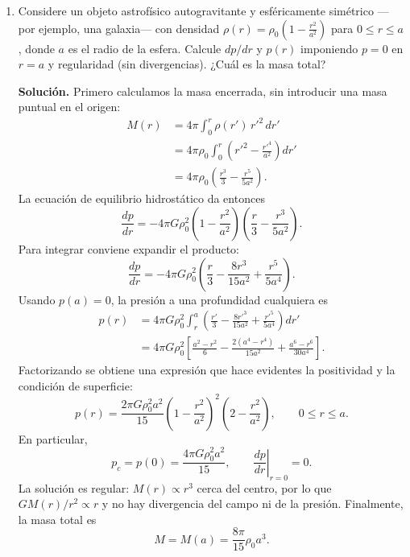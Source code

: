 \begin{enumerate}
\textit{3. Dependencia con el radio a masa fija.} Sustituyendo la densidad deducida en la expresión de la presión central,
$$
\begin{aligned}
p_c
&=\frac{2\pi G}{3}\rho_0^2a^2\\
&=\frac{2\pi G}{3}\left(\frac{3M_0}{4\pi a^3}\right)^2a^2
=\boxed{\frac{3GM_0^2}{8\pi a^4}}.
\end{aligned}
$$
Por tanto, a masa fija, $p_c\propto a^{-4}$. Por ejemplo, reducir el radio a la mitad multiplica la presión central por $16$. No se pueden mantener simultáneamente fijas la masa y la densidad al variar el radio.

\item Considere un objeto astrofísico autogravitante y esféricamente simétrico —por ejemplo, una galaxia— con densidad $\rho(r) = \rho_0\left(1 - \frac{r^2}{a^2}\right)$ para $0 \le r \le a$, donde $a$ es el radio de la esfera. Calcule $dp/dr$ y $p(r)$ imponiendo $p = 0$ en $r = a$ y regularidad (sin divergencias). ¿Cuál es la masa total?

\textbf{Solución.} Primero calculamos la masa encerrada, sin introducir una masa puntual en el origen:
$$
\begin{aligned}
M(r)
&=4\pi\int_0^r\rho(r')\,r'^2\,dr'\\
&=4\pi\rho_0\int_0^r\left(r'^2-\frac{r'^4}{a^2}\right)dr'\\
&=4\pi\rho_0\left(\frac{r^3}{3}-\frac{r^5}{5a^2}\right).
\end{aligned}
$$
La ecuación de equilibrio hidrostático da entonces
$$
\boxed{
\frac{dp}{dr}
=-4\pi G\rho_0^2
\left(1-\frac{r^2}{a^2}\right)
\left(\frac{r}{3}-\frac{r^3}{5a^2}\right)
}.
$$
Para integrar conviene expandir el producto:
$$
\frac{dp}{dr}
=-4\pi G\rho_0^2
\left(\frac{r}{3}-\frac{8r^3}{15a^2}+\frac{r^5}{5a^4}\right).
$$
Usando $p(a)=0$, la presión a una profundidad cualquiera es
$$
\begin{aligned}
p(r)
&=4\pi G\rho_0^2\int_r^a
\left(\frac{r'}{3}-\frac{8r'^3}{15a^2}+\frac{r'^5}{5a^4}\right)dr'\\
&=4\pi G\rho_0^2\left[
\frac{a^2-r^2}{6}
-\frac{2(a^4-r^4)}{15a^2}
+\frac{a^6-r^6}{30a^4}\right].
\end{aligned}
$$
Factorizando se obtiene una expresión que hace evidentes la positividad y la condición de superficie:
$$
\boxed{
p(r)=\frac{2\pi G\rho_0^2a^2}{15}
\left(1-\frac{r^2}{a^2}\right)^2
\left(2-\frac{r^2}{a^2}\right)
},\qquad 0\le r\le a.
$$
En particular,
$$
p_c=p(0)=\frac{4\pi G\rho_0^2a^2}{15},
\qquad \left.\frac{dp}{dr}\right|_{r=0}=0.
$$
La solución es regular: $M(r)\propto r^3$ cerca del centro, por lo que $GM(r)/r^2\propto r$ y no hay divergencia del campo ni de la presión. Finalmente, la masa total es
$$
\boxed{M=M(a)=\frac{8\pi}{15}\rho_0a^3}.
$$


\end{enumerate}
